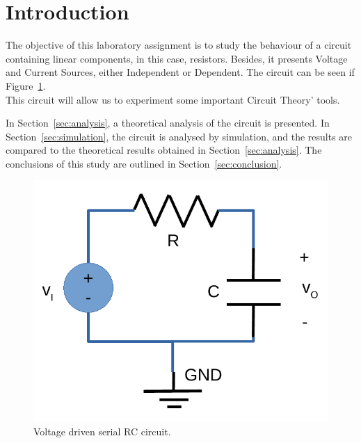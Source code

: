 \section{Introduction}
\label{sec:introduction}

The objective of this laboratory assignment is to study the behaviour of a circuit containing linear components, in this case, resistors. Besides, it presents Voltage and Current Sources, either Independent or Dependent. The circuit can be seen if Figure~\ref{fig:rc}.\\
This circuit will allow us to experiment some important Circuit Theory' tools.

\lipsum[1-1]

In Section~\ref{sec:analysis}, a theoretical analysis of the circuit is
presented. In Section~\ref{sec:simulation}, the circuit is analysed by
simulation, and the results are compared to the theoretical results obtained in
Section~\ref{sec:analysis}. The conclusions of this study are outlined in
Section~\ref{sec:conclusion}.

\begin{figure}[h] \centering
\includegraphics[width=0.4\linewidth]{rc.pdf}
\caption{Voltage driven serial RC circuit.}
\label{fig:rc}
\end{figure}

